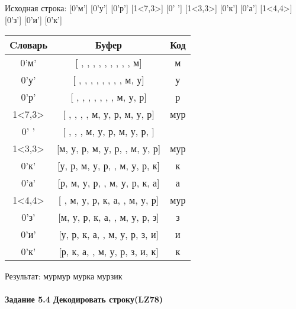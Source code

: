 \documentclass[a4paper, 12pt]{article}
\begin{document}
Исходная строка: [0'м'] [0'у'] [0'р'] [1<7,3>] [0' '] [1<3,3>] [0'к'] [0'а'] [1<4,4>] [0'з'] [0'и'] [0'к']\\
\begin{table}[h!]
\centering
\begin{tabular}{|c|c|c|}
\hline
 Cловарь & Буфер & Код  \\ \hline
0'м' & [ ,  ,  ,  ,  ,  ,  ,  ,  , м] & м
\\ \hline
0'у' & [ ,  ,  ,  ,  ,  ,  ,  , м, у] & у
\\ \hline
0'р' & [ ,  ,  ,  ,  ,  ,  , м, у, р] & р
\\ \hline
1<7,3> & [ ,  ,  ,  , м, у, р, м, у, р] & мур
\\ \hline
0' ' & [ ,  ,  , м, у, р, м, у, р,  ] &  
\\ \hline
1<3,3> & [м, у, р, м, у, р,  , м, у, р] & мур
\\ \hline
0'к' & [у, р, м, у, р,  , м, у, р, к] & к
\\ \hline
0'а' & [р, м, у, р,  , м, у, р, к, а] & а
\\ \hline
1<4,4> & [ , м, у, р, к, а,  , м, у, р] &  мур
\\ \hline
0'з' & [м, у, р, к, а,  , м, у, р, з] & з
\\ \hline
0'и' & [у, р, к, а,  , м, у, р, з, и] & и
\\ \hline
0'к' & [р, к, а,  , м, у, р, з, и, к] & к
\\ \hline
\end{tabular}
\end{table}

Результат: мурмур мурка мурзик
\pagebreak
\paragraph{Задание 5.4 Декодировать строку(LZ78)\\}
\end{document}
